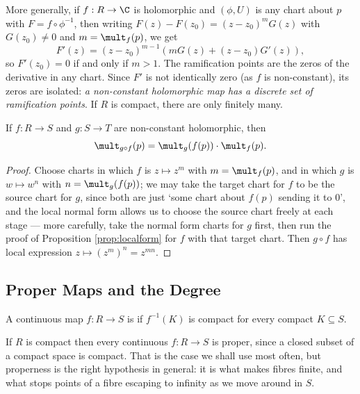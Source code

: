\begin{remark}	More generally, if $f : R \to \C$ is holomorphic and $(\phi, U)$ is any chart about $p$
	with $F = f\circ\phi^{-1}$, then writing $F(z) - F(z_0) = (z-z_0)^m G(z)$ with
	$G(z_0)\ne 0$ and $m = \mult_f(p)$, we get
	$$
	F'(z) = (z-z_0)^{m-1}\left(mG(z) + (z-z_0)G'(z)\right),
	$$
	so $F'(z_0) = 0$ if and only if $m > 1$. The ramification points are the zeros of the
	derivative in any chart. Since $F'$ is not identically zero (as $f$ is non-constant),
	its zeros are isolated: \emph{a non-constant holomorphic map has a discrete set of
	ramification points}. If $R$ is compact, there are only finitely many.
\end{remark}

\begin{lemma}[Multiplicativity]\label{lem:multmult}
	If $f : R \to S$ and $g : S \to T$ are non-constant holomorphic, then
	$$
	\mult_{g\circ f}(p) = \mult_g(f(p))\cdot \mult_f(p).
	$$
\end{lemma}

\begin{proof}
	Choose charts in which $f$ is $z \mapsto z^{m}$ with $m = \mult_f(p)$, and in which $g$
	is $w \mapsto w^{n}$ with $n = \mult_g(f(p))$; we may take the target chart for $f$ to
	be the source chart for $g$, since both are just `some chart about $f(p)$ sending it to
	$0$', and the local normal form allows us to choose the source chart freely at each
	stage --- more carefully, take the normal form charts for $g$ first, then run the proof
	of Proposition \ref{prop:localform} for $f$ with that target chart. Then $g\circ f$ has
	local expression $z \mapsto (z^{m})^{n} = z^{mn}$.
\end{proof}

\subsection{Proper Maps and the Degree}

\begin{definition}
	A continuous map $f : R \to S$ is  if $f^{-1}(K)$ is compact for every
	compact $K \subseteq S$.
\end{definition}

If $R$ is compact then every continuous $f : R \to S$ is proper, since a closed subset of
a compact space is compact. That is the case we shall use most often, but properness is
the right hypothesis in general: it is what makes fibres finite, and what stops points of
a fibre escaping to infinity as we move around in $S$.

